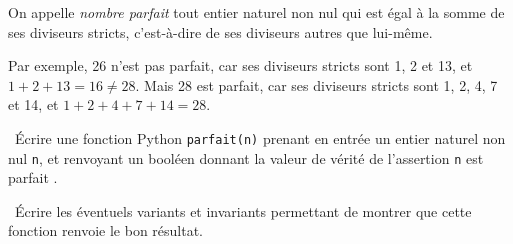 \exer{}
\setcounter{numques}{0}

On appelle \emph{nombre parfait} tout entier naturel non nul qui est égal à la somme de ses diviseurs stricts, c'est-à-dire de 
ses diviseurs autres que lui-même.

Par exemple, 26 n'est pas parfait, car ses diviseurs stricts sont 1, 2 et 13, et $1+2+13=16\neq 28$.
Mais 28 est parfait, car ses diviseurs stricts sont 1, 2, 4, 7 et 14, et $1+2+4+7+14=28$.

\question\ Écrire une fonction Python \texttt{parfait(n)} prenant en entrée un entier naturel non nul \texttt{n}, et renvoyant un booléen donnant la valeur de 
vérité de l'assertion \og \texttt{n} est parfait \fg. 

\question\ Écrire les éventuels variants et invariants permettant de montrer que cette fonction renvoie le bon résultat.

